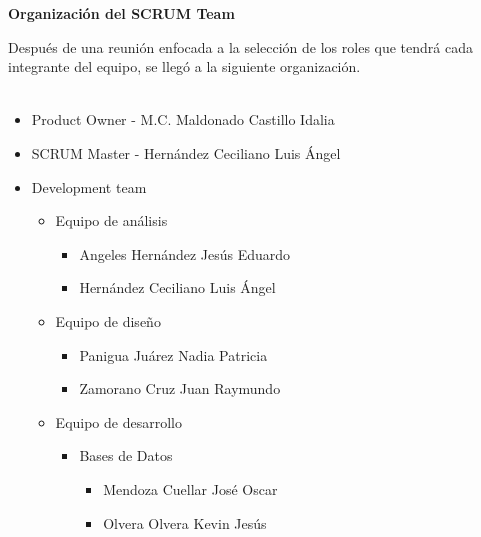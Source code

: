 \documentclass[12pt,letterpaper]{article}
\begin{document}
	\newpage
	\pagestyle{plain}
	{
		\par\vspace{0cm}
		{
			\begin{center}
					\Huge\textbf
					{
						Organización del SCRUM Team
					}
			\end{center}
		}
				\justify
                Después de una reunión enfocada a la selección de los roles
                que tendrá cada integrante del equipo, se llegó a la siguiente
                organización.
                \\\\
                \begin{itemize}
                    \item Product Owner - M.C. Maldonado Castillo Idalia 
                    \item SCRUM Master - Hernández Ceciliano Luis Ángel 
                    \item Development team
                        \begin{itemize}
                            \item Equipo de análisis
                                \begin{itemize}
                                    \item Angeles Hernández Jesús Eduardo
                                    \item Hernández Ceciliano Luis Ángel
                                \end{itemize}
                            \item Equipo de diseño
                            \begin{itemize}
                                \item Panigua Juárez Nadia Patricia
                                \item Zamorano Cruz Juan Raymundo
                            \end{itemize}
                            \item Equipo de desarrollo
                            \begin{itemize}
                                \item Bases de Datos
                                    \begin{itemize}
                                        \item Mendoza Cuellar José Oscar
                                        \item Olvera Olvera Kevin Jesús

\end{itemize}
\end{itemize}
\end{itemize}
\end{itemize}}
\end{document}
